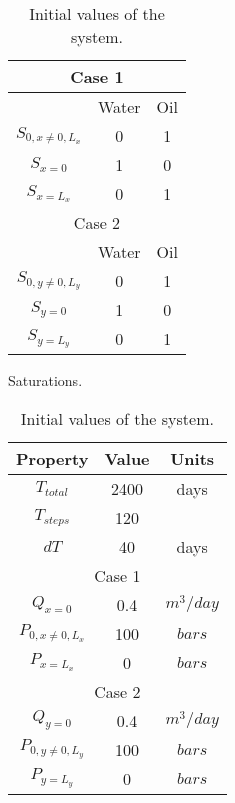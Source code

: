 \documentclass[12pt]{article}
\begin{document}
\begin{table}[!ht]
\begin{minipage}{.4\textwidth}
\centering
\begin{tabular}{ |c|c|c|} 
\hline
\multicolumn{3}{|c|}{Case 1}\\
\hline
&Water&Oil\\
\hline
$S_{0,x\neq 0, L_x}$&0&1\\
$S_{x=0}$&1&0\\
$S_{x=L_x}$&0&1\\
\hline
\multicolumn{3}{|c|}{Case 2}\\
\hline
&Water&Oil\\
\hline
$S_{0,y\neq 0, L_y}$&0&1\\
$S_{y=0}$&1&0\\
$S_{y=L_y}$&0&1\\
\hline
\end{tabular}
\caption{Saturations.}\label{table:sat}
\end{minipage}%
\hspace{1cm}
\begin{minipage}{.4\textwidth}
\centering
\begin{tabular}{ |c|c|c|} 
\hline
Property&Value&Units\\
\hline
    $T_{total}$&     2400& days\\
    $T_{steps}$& 120&\\
$dT$& 40&days\\
\hline
\multicolumn{3}{|c|}{Case 1}\\
\hline
$Q_{x=0}$&0.4&$m^3/day$\\
$P_{0,x\neq 0, L_x}$&100&$bars$\\
$P_{x=L_x}$&0&$bars$\\
\hline
\multicolumn{3}{|c|}{Case 2}\\
 \hline
 $Q_{y=0}$&0.4&$m^3/day$\\
$P_{0,y\neq 0, L_y}$&100&$bars$\\
$P_{y=L_y}$&0&$bars$\\
\hline
\end{tabular}\caption{Initial values of the system.}
\label{table:ic}
\end{minipage}
\end{table} 
\end{document}
